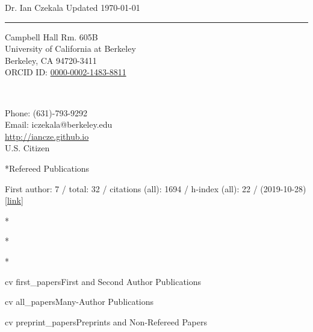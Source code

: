 \documentclass[10pt]{article}
\makeatletter
\renewcommand{\section}{\@startsection{section}{1}{0pt}{-\baselineskip}{0.5\baselineskip}{\scshape\color{myblue1}}}
\makeatother
\begin{document}
 \selectfont

{\huge \textcolor{myblue1}{Dr. Ian Czekala} } {\small \hfill Updated \today}

\rule{\textwidth}{1pt}

\parbox[t]{3in}{
\begin{flushleft}
Campbell Hall Rm. 605B\\
University of California at Berkeley\\
Berkeley, CA 94720-3411\\
ORCID ID: \href{http://orcid.org/0000-0002-1483-8811}{0000-0002-1483-8811} \\
\end{flushleft}} \ \hfill  \
\parbox[t]{3in}{
\begin{flushright}
Phone: (631)-793-9292\\
Email: iczekala@berkeley.edu\\
\url{http://iancze.github.io}\\
U.S. Citizen
\end{flushright}}

\vspace{12pt}


\section*{Refereed Publications}

First author: 7 / total: 32 / citations (all): 1694 / h-index (all): 22 / (2019-10-28) [\href{https://ui.adsabs.harvard.edu/#/public-libraries/G0Ow9TGTRyuVT7hbhzailA}{link}]


\nocite{first}{*}

\nocite{all}{*}

\nocite{preprint}{*}

{cv}
{first_papers}{First and Second Author Publications}

{cv}
{all_papers}{Many-Author Publications}

{cv}
{preprint_papers}{Preprints and Non-Refereed Papers}
\end{document}
